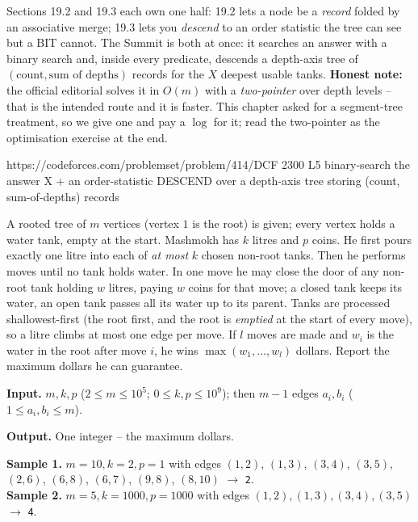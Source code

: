 
\begin{notebox}
Sections 19.2 and 19.3 each own one half: 19.2 lets a node be a \emph{record}
folded by an associative merge; 19.3 lets you \emph{descend} to an order statistic
the tree can see but a BIT cannot. The Summit is both at once: it searches an
answer with a binary search and, inside every predicate, descends a depth-axis tree
of \((\text{count},\text{sum of depths})\) records for the \(X\) deepest usable
tanks. \textbf{Honest note:} the official editorial solves it in \(O(m)\) with a
\emph{two-pointer} over depth levels -- that is the intended route and it is faster.
This chapter asked for a segment-tree treatment, so we give one and pay a
\(\log\) for it; read the two-pointer as the optimisation exercise at the end.
\end{notebox}

  {https://codeforces.com/problemset/problem/414/D}{CF 2300 L5}
  {binary-search the answer X + an order-statistic DESCEND over a depth-axis tree storing (count, sum-of-depths) records}

\begin{problemstatement}
A rooted tree of \(m\) vertices (vertex \(1\) is the root) is given; every vertex
holds a water tank, empty at the start. Mashmokh has \(k\) litres and \(p\) coins.
He first pours exactly one litre into each of \emph{at most} \(k\) chosen non-root
tanks. Then he performs moves until no tank holds water. In one move he may close
the door of any non-root tank holding \(w\) litres, paying \(w\) coins for that
move; a closed tank keeps its water, an open tank passes all its water up to its
parent. Tanks are processed shallowest-first (the root first, and the root is
\emph{emptied} at the start of every move), so a litre climbs at most one edge per
move. If \(l\) moves are made and \(w_i\) is the water in the root after move \(i\),
he wins \(\max(w_1,\dots,w_l)\) dollars. Report the maximum dollars he can guarantee.

\textbf{Input.} \(m,k,p\) (\(2\le m\le 10^{5}\); \(0\le k,p\le 10^{9}\)); then \(m-1\)
edges \(a_i,b_i\) (\(1\le a_i,b_i\le m\)).

\textbf{Output.} One integer -- the maximum dollars.

\textbf{Sample 1.} \(m{=}10,k{=}2,p{=}1\) with edges
\((1,2)\), \((1,3)\), \((3,4)\), \((3,5)\), \((2,6)\), \((6,8)\),
\((6,7)\), \((9,8)\), \((8,10)\) \(\to\) \texttt{2}.\\
\textbf{Sample 2.} \(m{=}5,k{=}1000,p{=}1000\) with edges
\((1,2),(1,3),(3,4),(3,5)\) \(\to\) \texttt{4}.
\end{problemstatement}

